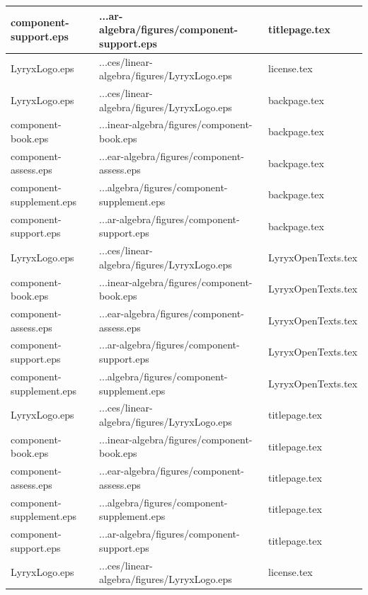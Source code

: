 \documentclass[11pt]{article}
\begin{document}
\begin{longtable}{|p{5cm}|p{4cm}|p{4cm}|}
component-support.eps & ...ar-algebra/figures/component-support.eps & titlepage.tex \\
\hline

LyryxLogo.eps & ...ces/linear-algebra/figures/LyryxLogo.eps & license.tex \\
\hline

LyryxLogo.eps & ...ces/linear-algebra/figures/LyryxLogo.eps & backpage.tex \\
\hline

component-book.eps & ...inear-algebra/figures/component-book.eps & backpage.tex \\
\hline

component-assess.eps & ...ear-algebra/figures/component-assess.eps & backpage.tex \\
\hline

component-supplement.eps & ...algebra/figures/component-supplement.eps & backpage.tex \\
\hline

component-support.eps & ...ar-algebra/figures/component-support.eps & backpage.tex \\
\hline

LyryxLogo.eps & ...ces/linear-algebra/figures/LyryxLogo.eps & LyryxOpenTexts.tex \\
\hline

component-book.eps & ...inear-algebra/figures/component-book.eps & LyryxOpenTexts.tex \\
\hline

component-assess.eps & ...ear-algebra/figures/component-assess.eps & LyryxOpenTexts.tex \\
\hline

component-support.eps & ...ar-algebra/figures/component-support.eps & LyryxOpenTexts.tex \\
\hline

component-supplement.eps & ...algebra/figures/component-supplement.eps & LyryxOpenTexts.tex \\
\hline

LyryxLogo.eps & ...ces/linear-algebra/figures/LyryxLogo.eps & titlepage.tex \\
\hline

component-book.eps & ...inear-algebra/figures/component-book.eps & titlepage.tex \\
\hline

component-assess.eps & ...ear-algebra/figures/component-assess.eps & titlepage.tex \\
\hline

component-supplement.eps & ...algebra/figures/component-supplement.eps & titlepage.tex \\
\hline

component-support.eps & ...ar-algebra/figures/component-support.eps & titlepage.tex \\
\hline

LyryxLogo.eps & ...ces/linear-algebra/figures/LyryxLogo.eps & license.tex \\
\hline

\end{longtable}
\end{document}
